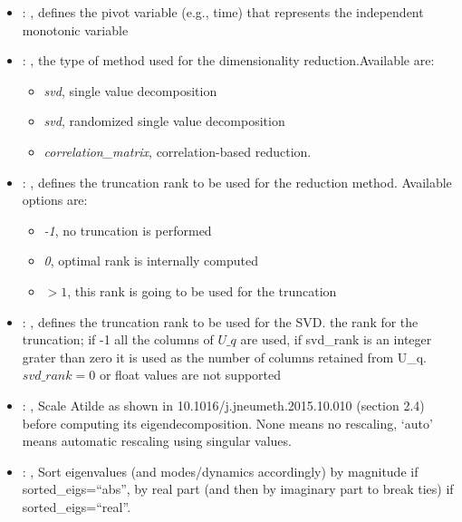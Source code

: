 \begin{itemize}
    \item {}: , 
      defines the pivot variable (e.g., time) that represents the
      independent monotonic variable

    \item {}: , 
      the type of method used for the dimensionality reduction.Available are:
      \begin{itemize}                                                     \item \textit{svd}, single
      value decomposition                                                     \item \textit{svd},
      randomized single value decomposition
      \item \textit{correlation\_matrix}, correlation-based reduction.
      \end{itemize}

    \item {}: , 
      defines the truncation rank to be used for the reduction method.
      Available options are:                                                  \begin{itemize}
      \item \textit{-1}, no truncation is performed
      \item \textit{0}, optimal rank is internally computed
      \item \textit{$>1$}, this rank is going to be used for the truncation
      \end{itemize}

    \item {}: , 
      defines the truncation rank to be used for the SVD.
      the rank for the truncation; if -1 all the columns of $U\_q$ are used,
      if svd\_rank is an integer grater than zero it is used as the number
      of columns retained from U\_q. $svd\_rank=0$ or float values are not supported

    \item {}: , 
      Scale Atilde as shown in 10.1016/j.jneumeth.2015.10.010 (section 2.4) before
      computing its eigendecomposition. None means no rescaling, ‘auto’ means automatic
      rescaling using singular values.

    \item {}: , 
      Sort eigenvalues (and modes/dynamics accordingly) by magnitude if sorted\_eigs=``abs'',
      by real part (and then by imaginary part to break ties) if sorted\_eigs=``real''.
  \end{itemize}

